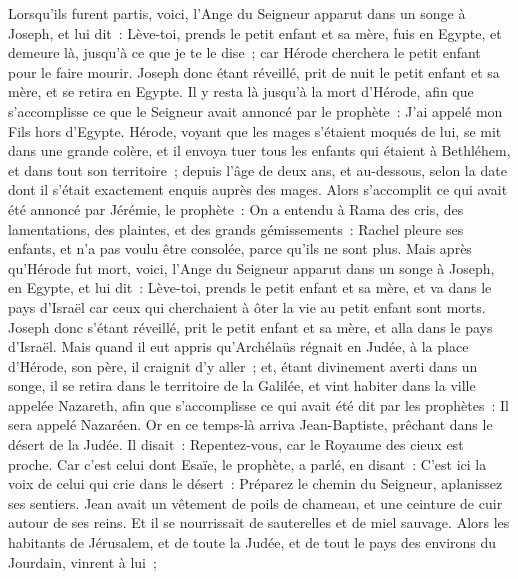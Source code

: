 \begin{multicols}{2}
Lorsqu'ils furent partis, voici, l'Ange du Seigneur apparut dans un songe à Joseph, et lui dit~: Lève-toi, prends le petit enfant et sa mère, fuis en Egypte, et demeure là, jusqu'à ce que je te le dise~; car Hérode cherchera le petit enfant pour le faire mourir.
Joseph donc étant réveillé, prit de nuit le petit enfant et sa mère, et se retira en Egypte.
Il y resta là jusqu'à la mort d'Hérode, afin que s'accomplisse ce que le Seigneur avait annoncé par le prophète~: J'ai appelé mon Fils hors d'Egypte.
Hérode, voyant que les mages s'étaient moqués de lui, se mit dans une grande colère, et il envoya tuer tous les enfants qui étaient à Bethléhem, et dans tout son territoire~; depuis l'âge de deux ans, et au-dessous, selon la date dont il s'était exactement enquis auprès des mages.
Alors s'accomplit ce qui avait été annoncé par Jérémie, le prophète~:
On a entendu à Rama des cris, des lamentations, des plaintes, et des grands gémissements~: Rachel pleure ses enfants, et n'a pas voulu être consolée, parce qu'ils ne sont plus.
Mais après qu'Hérode fut mort, voici, l'Ange du Seigneur apparut dans un songe à Joseph, en Egypte,
et lui dit~: Lève-toi, prends le petit enfant et sa mère, et va dans le pays d'Israël car ceux qui cherchaient à ôter la vie au petit enfant sont morts.
Joseph donc s'étant réveillé, prit le petit enfant et sa mère, et alla dans le pays d'Israël.
Mais quand il eut appris qu'Archélaüs régnait en Judée, à la place d'Hérode, son père, il craignit d'y aller~; et, étant divinement averti dans un songe, il se retira dans le territoire de la Galilée,
et vint habiter dans la ville appelée Nazareth, afin que s'accomplisse ce qui avait été dit par les prophètes~: Il sera appelé Nazaréen.
\VerseOne{}Or en ce temps-là arriva Jean-Baptiste, prêchant dans le désert de la Judée.
Il disait~: Repentez-vous, car le Royaume des cieux est proche.
Car c'est celui dont Esaïe, le prophète, a parlé, en disant~: C'est ici la voix de celui qui crie dans le désert~: Préparez le chemin du Seigneur, aplanissez ses sentiers.
Jean avait un vêtement de poils de chameau, et une ceinture de cuir autour de ses reins. Et il se nourrissait de sauterelles et de miel sauvage.
Alors les habitants de Jérusalem, et de toute la Judée, et de tout le pays des environs du Jourdain, vinrent à lui~;

\end{multicols}
